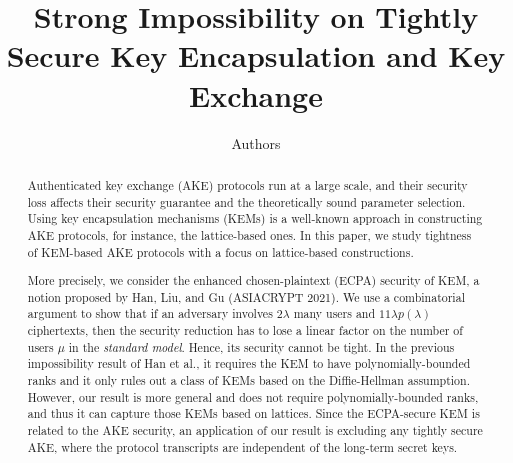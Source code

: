 \documentclass{llncs}
\title{Strong Impossibility on Tightly Secure Key Encapsulation and Key Exchange}
\date{\now}
\author{Authors}
\institute{Institutes}
\begin{document}
\maketitle

\begin{abstract}
	Authenticated key exchange (AKE) protocols run at a large scale, and their security loss affects their security guarantee and the theoretically sound parameter selection. Using key encapsulation mechanisms (KEMs) is a well-known approach in constructing AKE protocols, for instance, the lattice-based ones. In this paper, we study tightness of KEM-based AKE protocols with a focus on lattice-based constructions.
	
	\quad More precisely, we consider the enhanced chosen-plaintext (ECPA) security of KEM, a notion proposed by Han, Liu, and Gu (ASIACRYPT 2021). We use a combinatorial argument to show that if an adversary involves $2 \lambda$ many users and $11 \lambda p(\lambda)$ ciphertexts, then the security reduction has to lose a linear factor on the number of users $\mu$ in the \emph{standard model}. Hence, its security cannot be tight. In the previous impossibility result of Han et al., it requires the KEM to have polynomially-bounded ranks and it only rules out a class of KEMs based on the Diffie-Hellman assumption. However, our result is more general and does not require polynomially-bounded ranks, and thus it can capture those KEMs based on lattices. Since the ECPA-secure KEM is related to the AKE security, an application of our result is excluding any tightly secure AKE, where the protocol transcripts are independent of the long-term secret keys.
\end{abstract}












\appendix




\end{document}
